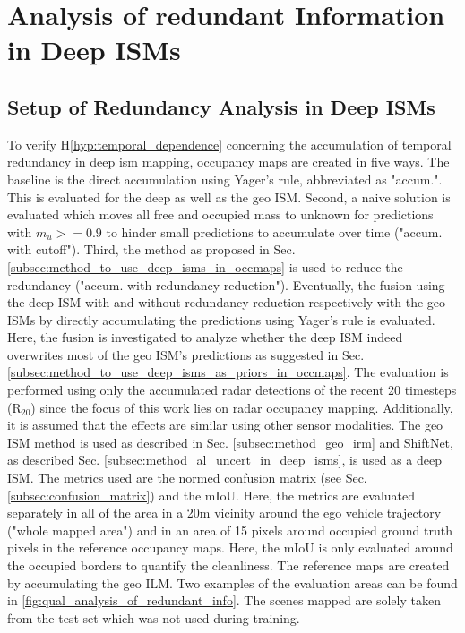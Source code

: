 \section{Analysis of redundant Information in Deep ISMs}
\label{sec:exp_analyze_redundant_info}
%
\subsection{Setup of Redundancy Analysis in Deep ISMs}
\label{subsec:setup_of_red_analy}
To verify H\ref{hyp:temporal_dependence} concerning the accumulation of temporal redundancy in deep \gls{ism} mapping, occupancy maps are created in five ways. The baseline is the direct accumulation using Yager's rule, abbreviated as "accum.". This is evaluated for the deep as well as the geo ISM. Second, a naive solution is evaluated which moves all free and occupied mass to unknown for predictions with $m_u>=0.9$ to hinder small predictions to accumulate over time ("accum. with cutoff"). Third, the method as proposed in Sec. \ref{subsec:method_to_use_deep_isms_in_occmaps} is used to reduce the redundancy ("accum. with redundancy reduction"). Eventually, the fusion using the deep ISM with and without redundancy reduction respectively with the geo ISMs by directly accumulating the predictions using Yager's rule is evaluated. Here, the fusion is investigated to analyze whether the deep ISM indeed overwrites most of the geo ISM's predictions as suggested in Sec. \ref{subsec:method_to_use_deep_isms_as_priors_in_occmaps}.
%
The evaluation is performed using only the accumulated radar detections of the recent 20 timesteps (R$_{20}$) since the focus of this work lies on radar occupancy mapping. Additionally, it is assumed that the effects are similar using other sensor modalities. The geo ISM method is used as described in Sec. \ref{subsec:method_geo_irm} and ShiftNet, as described Sec. \ref{subsec:method_al_uncert_in_deep_isms}, is used as a deep ISM.
%
The metrics used are the normed confusion matrix (see Sec. \ref{subsec:confusion_matrix}) and the mIoU. Here, the metrics are evaluated separately in all of the area in a 20m vicinity around the ego vehicle trajectory ("whole mapped area") and in an area of 15 pixels around occupied ground truth pixels in the reference occupancy maps. Here, the mIoU is only evaluated around the occupied borders to quantify the cleanliness. The reference maps are created by accumulating the geo ILM. Two examples of the evaluation areas can be found in \ref{fig:qual_analysis_of_redundant_info}. The scenes mapped are solely taken from the test set which was not used during training.
%
